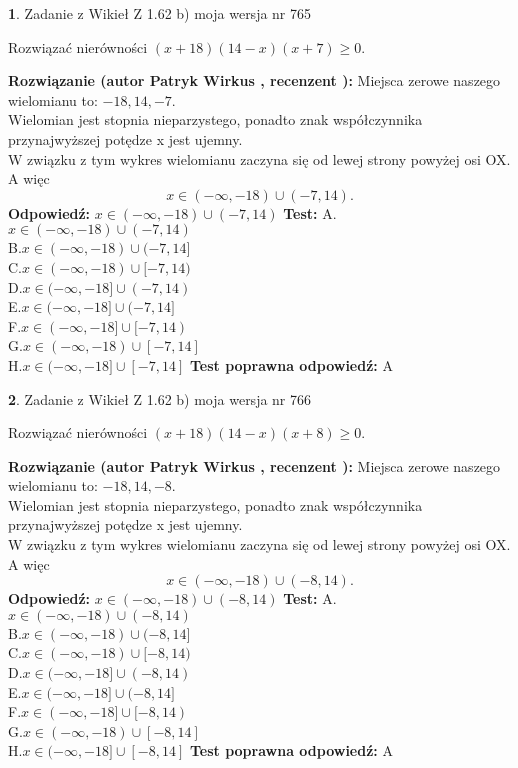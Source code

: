 \documentclass[12pt, a4paper]{article}
\theoremstyle{definition} %
\newtheorem{zad}{}
\newcommand{\zadStart}[1]{\begin{zad}#1\newline}
\newcommand{\zadStop}{\end{zad}}
\newcommand{\rozwStart}[2]{\noindent \textbf{Rozwiązanie (autor #1 , recenzent #2): }\newline}
\newcommand{\rozwStop}{\newline}
\newcommand{\odpStart}{\noindent \textbf{Odpowiedź:}\newline}
\newcommand{\odpStop}{\newline}
\newcommand{\testStart}{\noindent \textbf{Test:}\newline}
\newcommand{\testStop}{\newline}
\newcommand{\kluczStart}{\noindent \textbf{Test poprawna odpowiedź:}\newline}
\newcommand{\kluczStop}{\newline}
\begin{document}
\zadStart{Zadanie z Wikieł Z 1.62 b) moja wersja nr 765}

Rozwiązać nierówności $(x+18)(14-x)(x+7)\ge0$.
\zadStop
\rozwStart{Patryk Wirkus}{}
Miejsca zerowe naszego wielomianu to: $-18, 14, -7$.\\
Wielomian jest stopnia nieparzystego, ponadto znak współczynnika przy\linebreak najwyższej potędze x jest ujemny.\\ W związku z tym wykres wielomianu zaczyna się od lewej strony powyżej osi OX. A więc $$x \in (-\infty,-18) \cup (-7,14).$$
\rozwStop
\odpStart
$x \in (-\infty,-18) \cup (-7,14)$
\odpStop
\testStart
A.$x \in (-\infty,-18) \cup (-7,14)$\\
B.$x \in (-\infty,-18) \cup (-7,14]$\\
C.$x \in (-\infty,-18) \cup [-7,14)$\\
D.$x \in (-\infty,-18] \cup (-7,14)$\\
E.$x \in (-\infty,-18] \cup (-7,14]$\\
F.$x \in (-\infty,-18] \cup [-7,14)$\\
G.$x \in (-\infty,-18) \cup [-7,14]$\\
H.$x \in (-\infty,-18] \cup [-7,14]$
\testStop
\kluczStart
A
\kluczStop



\zadStart{Zadanie z Wikieł Z 1.62 b) moja wersja nr 766}

Rozwiązać nierówności $(x+18)(14-x)(x+8)\ge0$.
\zadStop
\rozwStart{Patryk Wirkus}{}
Miejsca zerowe naszego wielomianu to: $-18, 14, -8$.\\
Wielomian jest stopnia nieparzystego, ponadto znak współczynnika przy\linebreak najwyższej potędze x jest ujemny.\\ W związku z tym wykres wielomianu zaczyna się od lewej strony powyżej osi OX. A więc $$x \in (-\infty,-18) \cup (-8,14).$$
\rozwStop
\odpStart
$x \in (-\infty,-18) \cup (-8,14)$
\odpStop
\testStart
A.$x \in (-\infty,-18) \cup (-8,14)$\\
B.$x \in (-\infty,-18) \cup (-8,14]$\\
C.$x \in (-\infty,-18) \cup [-8,14)$\\
D.$x \in (-\infty,-18] \cup (-8,14)$\\
E.$x \in (-\infty,-18] \cup (-8,14]$\\
F.$x \in (-\infty,-18] \cup [-8,14)$\\
G.$x \in (-\infty,-18) \cup [-8,14]$\\
H.$x \in (-\infty,-18] \cup [-8,14]$
\testStop
\kluczStart
A
\kluczStop
\end{document}
